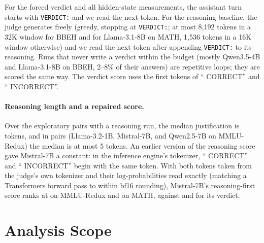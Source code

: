 For the forced verdict and all hidden-state measurements, the assistant turn starts with \texttt{VERDICT:} and we read the next token. For the reasoning baseline, the judge generates freely (greedy, stopping at \texttt{VERDICT:}; at most 8,192 tokens in a 32K window for BBEH and for Llama-3.1-8B on MATH, 1,536 tokens in a 16K window otherwise) and we read the next token after appending \texttt{VERDICT:} to its reasoning. Runs that never write a verdict within the budget (mostly Qwen3.5-4B and Llama-3.1-8B on BBEH, 2--8\% of their answers) are repetitive loops; they are scored the same way. The verdict score uses the first tokens of `` CORRECT'' and `` INCORRECT''.

\paragraph{Reasoning length and a repaired score.} Over the  exploratory pairs with a reasoning run, the median justification is  tokens, and in  pairs (Llama-3.2-1B, Mistral-7B, and Qwen2.5-7B on MMLU-Redux) the median is at most 5 tokens. An earlier version of the reasoning score gave Mistral-7B a constant: in the inference engine's tokenizer, `` CORRECT'' and `` INCORRECT'' begin with the same token. With both tokens taken from the judge's own tokenizer and their log-probabilities read exactly (matching a Transformers forward pass to within bf16 rounding), Mistral-7B's reasoning-first score ranks at  on MMLU-Redux and  on MATH, against  and  for its verdict.

\section{Analysis Scope}
\label{app:scope}

